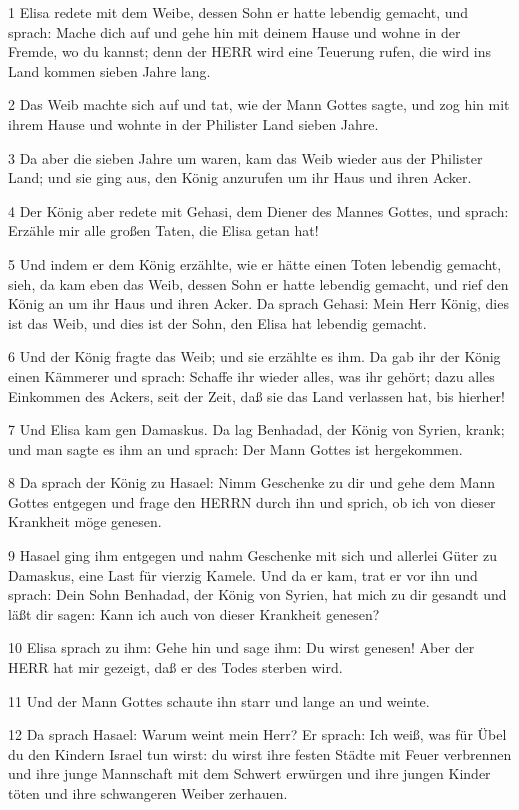 \par 1 Elisa redete mit dem Weibe, dessen Sohn er hatte lebendig gemacht, und sprach: Mache dich auf und gehe hin mit deinem Hause und wohne in der Fremde, wo du kannst; denn der HERR wird eine Teuerung rufen, die wird ins Land kommen sieben Jahre lang.
\par 2 Das Weib machte sich auf und tat, wie der Mann Gottes sagte, und zog hin mit ihrem Hause und wohnte in der Philister Land sieben Jahre.
\par 3 Da aber die sieben Jahre um waren, kam das Weib wieder aus der Philister Land; und sie ging aus, den König anzurufen um ihr Haus und ihren Acker.
\par 4 Der König aber redete mit Gehasi, dem Diener des Mannes Gottes, und sprach: Erzähle mir alle großen Taten, die Elisa getan hat!
\par 5 Und indem er dem König erzählte, wie er hätte einen Toten lebendig gemacht, sieh, da kam eben das Weib, dessen Sohn er hatte lebendig gemacht, und rief den König an um ihr Haus und ihren Acker. Da sprach Gehasi: Mein Herr König, dies ist das Weib, und dies ist der Sohn, den Elisa hat lebendig gemacht.
\par 6 Und der König fragte das Weib; und sie erzählte es ihm. Da gab ihr der König einen Kämmerer und sprach: Schaffe ihr wieder alles, was ihr gehört; dazu alles Einkommen des Ackers, seit der Zeit, daß sie das Land verlassen hat, bis hierher!
\par 7 Und Elisa kam gen Damaskus. Da lag Benhadad, der König von Syrien, krank; und man sagte es ihm an und sprach: Der Mann Gottes ist hergekommen.
\par 8 Da sprach der König zu Hasael: Nimm Geschenke zu dir und gehe dem Mann Gottes entgegen und frage den HERRN durch ihn und sprich, ob ich von dieser Krankheit möge genesen.
\par 9 Hasael ging ihm entgegen und nahm Geschenke mit sich und allerlei Güter zu Damaskus, eine Last für vierzig Kamele. Und da er kam, trat er vor ihn und sprach: Dein Sohn Benhadad, der König von Syrien, hat mich zu dir gesandt und läßt dir sagen: Kann ich auch von dieser Krankheit genesen?
\par 10 Elisa sprach zu ihm: Gehe hin und sage ihm: Du wirst genesen! Aber der HERR hat mir gezeigt, daß er des Todes sterben wird.
\par 11 Und der Mann Gottes schaute ihn starr und lange an und weinte.
\par 12 Da sprach Hasael: Warum weint mein Herr? Er sprach: Ich weiß, was für Übel du den Kindern Israel tun wirst: du wirst ihre festen Städte mit Feuer verbrennen und ihre junge Mannschaft mit dem Schwert erwürgen und ihre jungen Kinder töten und ihre schwangeren Weiber zerhauen.
